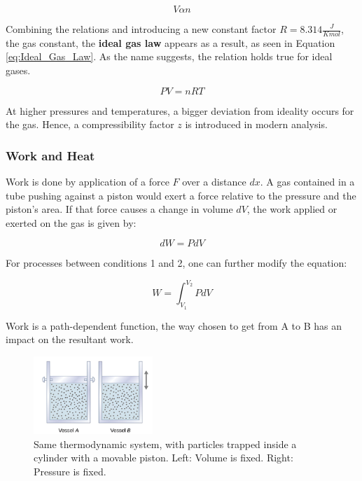 \begin{equation}
\label{eq:Avogadro's Law}
    \mathit{V \alpha n} 
\end{equation}



Combining the relations and introducing a new constant factor $\mathit{R} = 8.314 \frac{J}{Kmol}$, the gas constant, the \textbf{ideal gas law} appears as a result, as seen in Equation \ref{eq:Ideal_Gas_Law}. As the name suggests, the relation holds true for ideal gases. \cite[pp.~391-395]{Brown}

\begin{equation}
\label{eq:Ideal_Gas_Law}
    \mathit{PV = nRT}
\end{equation}

At higher pressures and temperatures, a bigger deviation from ideality occurs for the gas. Hence, a compressibility factor $\mathit{z}$ is introduced in modern analysis. \cite{AHMED201029}

\subsubsection{Work and Heat}
\label{Work-Heat}

Work is done by application of a force $\mathit{F}$ over a distance $\mathit{dx}$. A gas contained in a tube pushing against a piston would exert a force relative to the pressure and the piston's area. If that force causes a change in volume $\mathit{dV}$, the work applied or exerted on the gas is given by: \cite{Ling2016-bs}

\begin{equation}
\label{eq:Work}
    \mathit{dW = PdV}
\end{equation}

For processes between conditions 1 and 2, one can further modify the equation:

\begin{equation}
\label{eq:Work_Int}
    \mathit{W = \int_{V_1}^{V_2} PdV}
\end{equation}

Work is a path-dependent function, the way chosen to get from A to B has an impact on the resultant work. 

\begin{figure}  %
    \centering
    \includegraphics[width=0.4\textwidth]{Graphics/Constant_Diagrams.png}  %
    \caption{Same thermodynamic system, with particles trapped inside a cylinder with a movable piston. Left: Volume is fixed. Right: Pressure is fixed. \cite{Ling2016-bs}  }
    \label{fig:Constants}
\end{figure}

